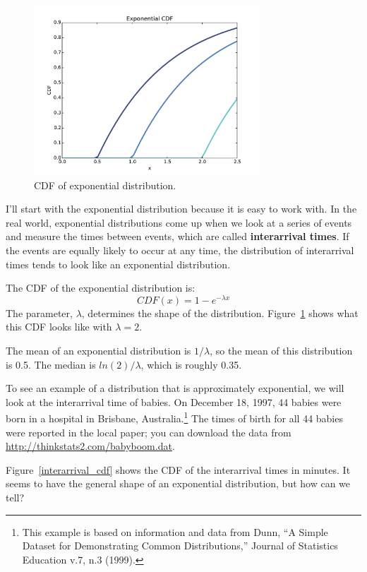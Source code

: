 \documentclass[12pt]{book}
\begin{document}
\begin{figure}
\centerline{\includegraphics[height=2.5in]{figs/expo_cdf.pdf}}
\caption{CDF of exponential distribution.}
\label{expo_cdf}
\end{figure}

I'll start with the exponential distribution because it is
easy to work with.  In the real world, exponential distributions
come up when we look at a series of events and measure the
times between events, which are called {\bf interarrival times}.
If the events are equally likely to occur at any time, the distribution
of interarrival times tends to look like an exponential distribution.

The CDF of the exponential distribution is:
%
\[ CDF(x) = 1 - e^{-\lambda x} \]
%
The parameter, $\lambda$, determines the shape of the
distribution.  Figure~\ref{expo_cdf} shows what this CDF looks like with
$\lambda = 2$.

The mean of an exponential distribution is $1/\lambda$, so
the mean of this distribution is 0.5.  The median is $ln(2)/\lambda$,
which is roughly 0.35.    

To see an example of a distribution that is approximately exponential,
we will look at the interarrival time of babies.
On December 18, 1997, 44 babies were born in a hospital in Brisbane,
Australia.\footnote{This example is based on information and data from
  Dunn, ``A Simple Dataset for Demonstrating Common Distributions,''
  Journal of Statistics Education v.7, n.3 (1999).}  The times of
birth for all 44 babies were reported in the local paper; you can
download the data from \url{http://thinkstats2.com/babyboom.dat}.

Figure~\ref{interarrival_cdf} shows the CDF of the interarrival times
in minutes.  It seems to have the general shape of an exponential
distribution, but how can we tell?
\end{document}
